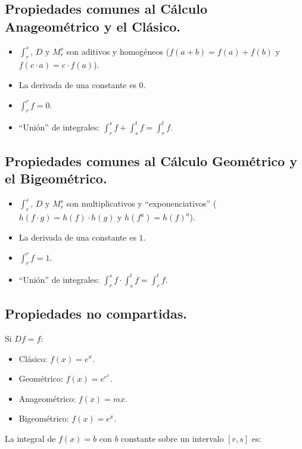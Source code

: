 \newpage

\subsection{Propiedades comunes al Cálculo Anageométrico y el Clásico.}

\begin{itemize}	
	\item $\int_r^s$, $D$ y $M_r^s$ son aditivos y homogéneos ($f(a + b) = f(a) + f(b)$ y $f(c\cdot a) = c\cdot f(a)$).
	\item La derivada de una constante es $0$.
	\item $\int_r^r f = 0$.
	\item \enquote{Unión} de integrales: $\int_r^s f + \int_s^t f = \int_r^t f$.
\end{itemize}

\subsection{Propiedades comunes al Cálculo Geométrico y el Bigeométrico.}

\begin{itemize}
	\item $\int_r^s$, $D$ y $M_r^s$ son multiplicativos y \enquote{exponenciativos} ($h(f\cdot g) = h(f)\cdot h(g)$ y $h(f^a) = h(f)^a$).
	\item La derivada de una constante es $1$.
	\item $\int_r^r f = 1$.
	\item \enquote{Unión} de integrales: $\int_r^s f \cdot \int_s^t f = \int_r^t f$.
\end{itemize}

\subsection{Propiedades no compartidas.}

Si $Df = f$:

\begin{itemize}
	\item Clásico: $f(x) = e^x$.
	\item Geométrico: $f(x) = e^{e^x}$.
	\item Anageométrico: $f(x) = mx$.
	\item Bigeométrico: $f(x) = e^x$.
\end{itemize}

La integral de $f(x) = b$ con $b$ constante sobre un intervalo $[r, s]$ es:

